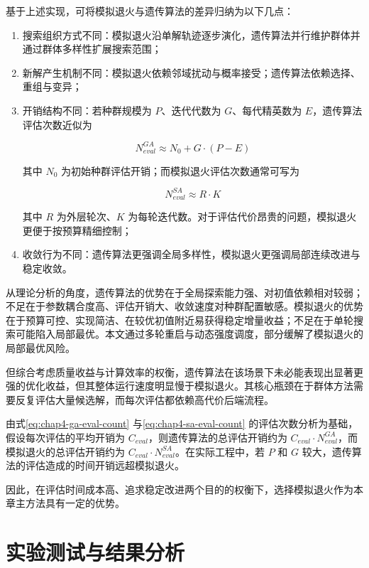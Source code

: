 基于上述实现，可将模拟退火与遗传算法的差异归纳为以下几点：
\begin{enumerate}
    \item 搜索组织方式不同：模拟退火沿单解轨迹逐步演化，遗传算法并行维护群体并通过群体多样性扩展搜索范围；
    \item 新解产生机制不同：模拟退火依赖邻域扰动与概率接受；遗传算法依赖选择、重组与变异；
    \item 开销结构不同：若种群规模为 $P$、迭代代数为 $G$、每代精英数为 $E$，遗传算法评估次数近似为

\begin{equation}
\label{eq:chap4-ga-eval-count}
N_{eval}^{GA}\approx N_0 + G\cdot(P-E)
\end{equation}

其中 $N_0$ 为初始种群评估开销；而模拟退火评估次数通常可写为

\begin{equation}
\label{eq:chap4-sa-eval-count}
N_{eval}^{SA}\approx R\cdot K
\end{equation}

其中 $R$ 为外层轮次、$K$ 为每轮迭代数。对于评估代价昂贵的问题，模拟退火更便于按预算精细控制；
    \item 收敛行为不同：遗传算法更强调全局多样性，模拟退火更强调局部连续改进与稳定收敛。
\end{enumerate}

从理论分析的角度，遗传算法的优势在于全局探索能力强、对初值依赖相对较弱；不足在于参数耦合度高、评估开销大、收敛速度对种群配置敏感。模拟退火的优势在于预算可控、实现简洁、在较优初值附近易获得稳定增量收益；不足在于单轮搜索可能陷入局部最优。本文通过多轮重启与动态强度调度，部分缓解了模拟退火的局部最优风险。

但综合考虑质量收益与计算效率的权衡，遗传算法在该场景下未必能表现出显著更强的优化收益，但其整体运行速度明显慢于模拟退火。其核心瓶颈在于群体方法需要反复评估大量候选解，而每次评估都依赖高代价后端流程。

由式\ref{eq:chap4-ga-eval-count} 与\ref{eq:chap4-sa-eval-count} 的评估次数分析为基础，假设每次评估的平均开销为 $C_{eval}$，则遗传算法的总评估开销约为 $C_{eval}\cdot N_{eval}^{GA}$，而模拟退火的总评估开销约为 $C_{eval}\cdot N_{eval}^{SA}$。在实际工程中，若 $P$ 和 $G$ 较大，遗传算法的评估造成的时间开销远超模拟退火。


因此，在评估时间成本高、追求稳定改进两个目的的权衡下，选择模拟退火作为本章主方法具有一定的优势。%

\section{实验测试与结果分析}
\label{sec:chap4-exp}

